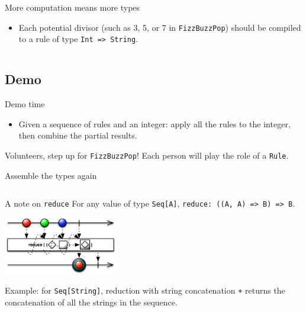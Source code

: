 
\begin{frame}[fragile]{More computation means more types}
  \begin{itemize}
  \item Each potential divisor (such as 3, 5, or 7 in \texttt{FizzBuzzPop}) should be compiled to a rule of type \texttt{Int => String}.
  \end{itemize}

  \inputminted[gobble=2]{scala}{FizzBuzz4.scala}
\end{frame}

\subsection{Demo}

\begin{frame}{Demo time}
  \begin{itemize}
  \item Given a sequence of rules and an integer: apply all the rules to the integer, then combine the partial results.
  \end{itemize}

  \begin{block}{Volunteers, step up for \texttt{FizzBuzzPop}!}
    Each person will play the role of a \texttt{Rule}.
  \end{block}
\end{frame}

\begin{frame}[fragile]{Assemble the types again}
  \inputminted[gobble=2]{scala}{FizzBuzz5.scala}
\end{frame}

\begin{frame}[fragile]{A note on \texttt{reduce}}
  For any value of type \texttt{Seq[A]}, \texttt{reduce: ((A, A) => B) => B}.
  \begin{center}
    \includegraphics[height=2.5cm]{reduce.png}
  \end{center}

  Example: for \texttt{Seq[String]}, reduction with string concatenation \texttt{+} returns the concatenation of all the strings in the sequence.
\end{frame}

